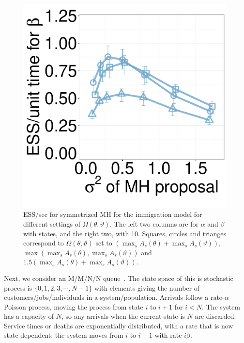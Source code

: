 \begin{figure}[H]
\begin{minipage}[hp]{0.24\linewidth}
	\end{minipage}
  \begin{minipage}[hp]{0.24\linewidth}
  \centering
    \includegraphics [width=0.99\textwidth, angle=0]{figs/new_whole_exp_figs/mh_q_beta_dim10.pdf}
	\end{minipage}
    \caption{ESS/sec for symmetrized MH for the immigration model for different settings of $\Omega(\theta,\vartheta)$. The left two columns are for $\alpha$ and $\beta$ with states, and the right two, with 10. 
    Squares, circles and trianges correspond to $\Omega(\theta,\vartheta)$ set to $(\max_s A_s(\theta) + \max_s A_s(\vartheta))$, $\max(\max_s A_s(\theta), \max_s A_s(\vartheta))$ and  $1.5(\max_s A_s(\theta) + \max_s A_s(\vartheta))$.
  }
    \label{fig:mhESS_Q}
  \end{figure}


Next, we consider an M/M/N/N queue~\citep{gross2011fundamentals}. The state space of this is stochastic 
process is $\{0, 1, 2, 3, \cdots, N - 1\}$ with 
elements giving the number of customers/jobs/individuals in a system/population. 
Arrivals follow a rate-$\alpha$ Poisson process, moving the process from state 
$i$ to $i+1$ for $i<N$. The system has a capacity of $N$, so any arrivals when 
the current state is $N$ are discarded.  Service times or deaths are 
exponentially distributed, with a rate that is now state-dependent:
the system moves from $i$ to $i - 1$ with rate $i\beta$. 

